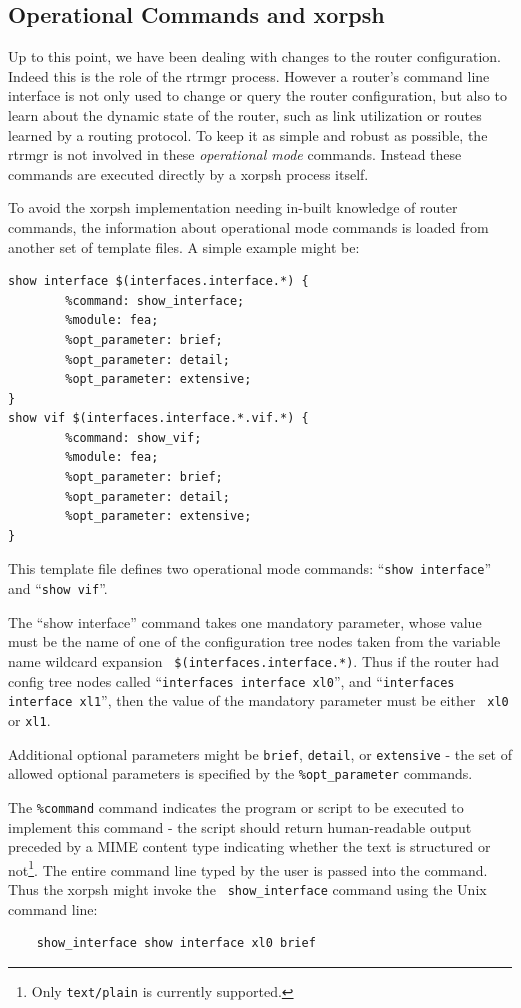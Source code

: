 \documentclass[11pt]{article}
\begin{document}
\subsection{Operational Commands and xorpsh}
Up to this point, we have been dealing with changes to the router
configuration.  Indeed this is the role of the rtrmgr process.
However a router's command line interface is not only used to change
or query the router configuration, but also to learn about the dynamic
state of the router, such as link utilization or routes learned by a
routing protocol.  To keep it as simple and robust as possible, the
rtrmgr is not involved in these \textit{operational mode} commands.
Instead these commands are executed directly by a xorpsh process
itself.

To avoid the xorpsh implementation needing in-built knowledge of
router commands, the information about operational mode commands is
loaded from another set of template files.  A simple example might be:
\begin{verbatim}
show interface $(interfaces.interface.*) {
        %command: show_interface;
        %module: fea;
        %opt_parameter: brief;
        %opt_parameter: detail;
        %opt_parameter: extensive;
}
show vif $(interfaces.interface.*.vif.*) {
        %command: show_vif;
        %module: fea;
        %opt_parameter: brief;
        %opt_parameter: detail;
        %opt_parameter: extensive;
}
\end{verbatim}
This template file defines two operational mode commands: ``{\tt show
interface}'' and ``{\tt show vif}''.

The ``show interface'' command takes one mandatory parameter, whose
value must be the name of one of the configuration tree nodes taken
from the variable name wildcard expansion {\tt
\$(interfaces.interface.*)}.  Thus if the router had config tree nodes
called ``{\tt interfaces interface xl0}'', and ``{\tt interfaces interface
xl1}'', then the value of the mandatory parameter must be either {\tt
xl0} or {\tt xl1}.  

Additional optional parameters might be {\tt brief}, {\tt detail}, or
{\tt extensive} - the set of allowed optional parameters is specified
by the {\tt \%opt\_parameter} commands.  

The {\tt \%command} command indicates the program or script to be
executed to implement this command - the script should return
human-readable output preceded by a MIME content type indicating
whether the text is structured or not\footnote{Only {\tt text/plain}
is currently supported.}.  The entire command line typed by the user
is passed into the command.  Thus the xorpsh might invoke the {\tt
show\_interface} command using the Unix command line:
\begin{verbatim}
    show_interface show interface xl0 brief
\end{verbatim}
\end{document}
